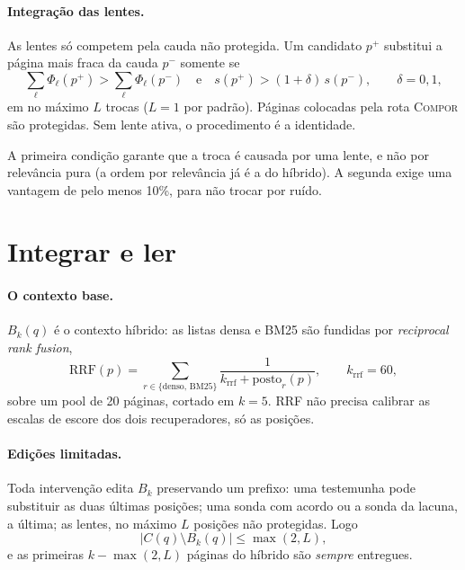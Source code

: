 \documentclass[11pt]{article}
\newcommand{\Compose}{\textsc{Compor}}
\begin{document}
\paragraph{Integração das lentes.}
As lentes só competem pela cauda não protegida. Um candidato $p^+$ substitui a
página mais fraca da cauda $p^-$ somente se
\[
\textstyle\sum_\ell\Phi_\ell(p^+)>\sum_\ell\Phi_\ell(p^-)
\quad\text{e}\quad
s(p^+)>(1+\delta)\,s(p^-),\qquad \delta=0{,}1,
\]
em no máximo $L$ trocas ($L=1$ por padrão). Páginas colocadas pela rota
\Compose{} são protegidas. Sem lente ativa, o procedimento é a identidade.

\begin{empalavras}
A primeira condição garante que a troca é causada por uma lente, e não por
relevância pura (a ordem por relevância já é a do híbrido). A segunda exige
uma vantagem de pelo menos 10\%, para não trocar por ruído.
\end{empalavras}

\section{Integrar e ler}\label{sec:integrar}

\paragraph{O contexto base.}
$B_k(q)$ é o contexto híbrido: as listas densa e BM25 são fundidas por
\emph{reciprocal rank fusion},
\[
\mathrm{RRF}(p)=\sum_{r\in\{\text{denso},\,\text{BM25}\}}\frac{1}{k_{\text{rrf}}+\mathrm{posto}_r(p)},\qquad k_{\text{rrf}}=60,
\]
sobre um pool de 20 páginas, cortado em $k=5$. RRF não precisa calibrar as
escalas de escore dos dois recuperadores, só as posições.

\paragraph{Edições limitadas.}
Toda intervenção edita $B_k$ preservando um prefixo: uma testemunha pode
substituir as duas últimas posições; uma sonda com acordo ou a sonda da
lacuna, a última; as lentes, no máximo $L$ posições não protegidas. Logo
\begin{equation}
  |C(q)\setminus B_k(q)|\le\max(2,L),
  \label{eq:edicoes}
\end{equation}
e as primeiras $k-\max(2,L)$ páginas do híbrido são \emph{sempre} entregues.
\end{document}
